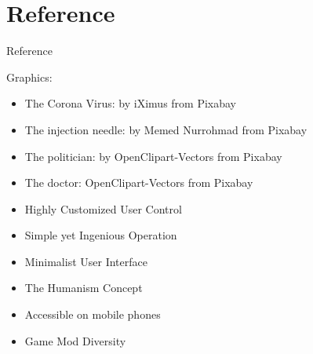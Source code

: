 \documentclass{beamer}
\begin{document}
\section{Reference}

\begin{frame}{Reference}

	Graphics:
	\begin{itemize}\bigsep
		\item The Corona Virus: by iXimus from Pixabay
		\item The injection needle: by Memed Nurrohmad from Pixabay
		\item The politician: by OpenClipart-Vectors from Pixabay
		\item The doctor: OpenClipart-Vectors from Pixabay
	\end{itemize}

\end{frame}




\begin{framek}

\begin{itemize}\itemsep .5cm
		\item Highly Customized User Control
		\item Simple yet Ingenious Operation
		\item Minimalist User Interface
		\item The Humanism Concept
		\item Accessible on mobile phones
		\item Game Mod Diversity
	\end{itemize}

\end{framek}
\end{document}
